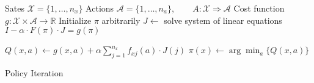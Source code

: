 \documentclass{article}
\begin{document}
\begin{preview}
    \begin{algorithm}[H]
        \begin{algorithmic}
        \Require
        \Statex Sates $\mathcal{X} = \{1, \dots, n_x\}$
        \Statex Actions $\mathcal{A} = \{1, \dots, n_a\},\qquad A: \mathcal{X} \Rightarrow \mathcal{A}$
        \Statex Cost function $g: \mathcal{X} \times \mathcal{A} \rightarrow \mathbb{R}$
            \State Initialize $\pi$ arbitrarily
                \State $J \gets$ solve system of linear equations $I - \alpha \cdot F(\pi) \cdot J = g(\pi)$

                        \State $Q(x, a) \gets g(x, a) + \alpha \sum_{j=1}^{n_x} f_{xj}(a) \cdot J(j)$
                    \EndFor
                \EndFor
                    \State $\pi(x) \gets \arg \min_a \{Q(x, a)\}$
                \EndFor
            \EndWhile
        \EndProcedure
        \end{algorithmic}
    \caption{Policy Iteration}
    \label{alg:policy-iteration}
    \end{algorithm}
\end{preview}
\end{document}
